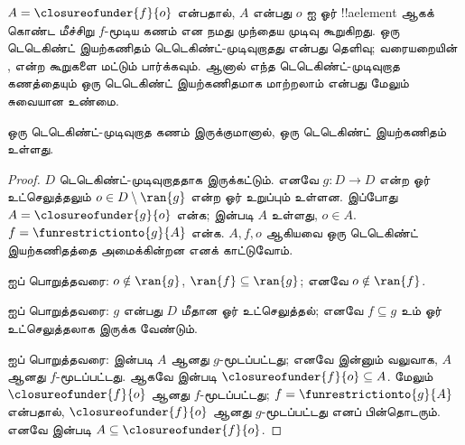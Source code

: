 \documentclass[../../../include/open-logic-section]{subfiles}
\begin{document}
$A = \closureofunder{f}{o}$ என்பதால், $A$ என்பது $o$ ஐ ஓர்
!!a{element} ஆகக் கொண்ட மீச்சிறு $f$-மூடிய கணம் என நமது முந்தைய
முடிவு கூறுகிறது.
ஒரு டெடெகிண்ட் இயற்கணிதம் டெடெகிண்ட்-முடிவுறாதது என்பது தெளிவு;
வரையறையின் ,  என்ற
கூறுகளை மட்டும் பார்க்கவும்.
ஆனால் எந்த டெடெகிண்ட்-முடிவுறாத கணத்தையும் ஒரு டெடெகிண்ட்
இயற்கணிதமாக மாற்றலாம் என்பது மேலும் சுவையான உண்மை.

\begin{thm}
ஒரு டெடெகிண்ட்-முடிவுறாத கணம் இருக்குமானால்,
ஒரு டெடெகிண்ட் இயற்கணிதம் உள்ளது.
\end{thm}

\begin{proof}
$D$ டெடெகிண்ட்-முடிவுறாததாக இருக்கட்டும்.
எனவே $g \colon D \to D$ என்ற ஓர் உட்செலுத்தலும்
$o  \in D \setminus \ran{g}$ என்ற ஓர் உறுப்பும் உள்ளன.
இப்போது $A = \closureofunder{g}{o}$ என்க;
 இன்படி $A$ உள்ளது, $o \in A$.
$f = \funrestrictionto{g}{A}$ என்க.
$A, f, o$ ஆகியவை ஒரு டெடெகிண்ட் இயற்கணிதத்தை அமைக்கின்றன
எனக் காட்டுவோம்.

 ஐப் பொறுத்தவரை:
$o \notin \ran{g}$, $\ran{f} \subseteq \ran{g}$;
எனவே $o\notin \ran{f}$.

 ஐப் பொறுத்தவரை:
$g$ என்பது $D$ மீதான ஓர் உட்செலுத்தல்;
எனவே $f \subseteq g$ உம் ஓர் உட்செலுத்தலாக இருக்க வேண்டும்.

 ஐப் பொறுத்தவரை:
 இன்படி $A$ ஆனது $g$-மூடப்பட்டது;
எனவே இன்னும் வலுவாக, $A$ ஆனது $f$-மூடப்பட்டது.
ஆகவே  இன்படி
$\closureofunder{f}{o} \subseteq A$.
மேலும் $\closureofunder{f}{o}$ ஆனது $f$-மூடப்பட்டது;
$f = \funrestrictionto{g}{A}$ என்பதால்,
$\closureofunder{f}{o}$ ஆனது $g$-மூடப்பட்டது எனப் பின்தொடரும்.
எனவே  இன்படி
$A \subseteq \closureofunder{f}{o}$.
\end{proof}
\end{document}
